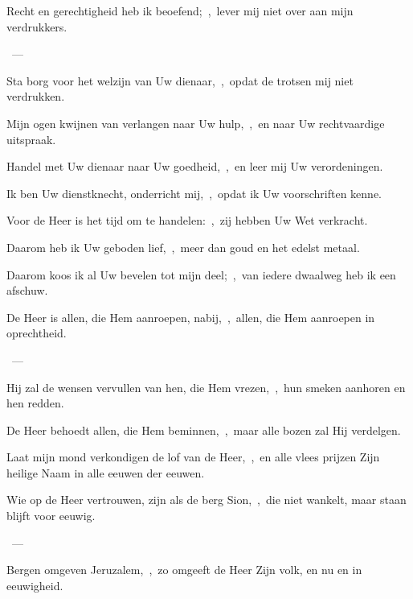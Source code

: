 \documentclass[12pt,twoside,a5paper]{article}
\begin{document}
\begin{halfparskip}
    Recht en gerechtigheid heb ik beoefend;~\sep\ lever mij niet over aan mijn verdrukkers.

  ~--- 

  Sta borg voor het welzijn van Uw dienaar,~\sep\ opdat de trotsen mij niet verdrukken.

  Mijn ogen kwijnen van verlangen naar Uw hulp,~\sep\ en naar Uw rechtvaardige uitspraak.

  Handel met Uw dienaar naar Uw goedheid,~\sep\ en leer mij Uw verordeningen.

  Ik ben Uw dienstknecht, onderricht mij,~\sep\ opdat ik Uw voorschriften kenne.

  Voor de Heer is het tijd om te handelen:~\sep\ zij hebben Uw Wet verkracht.

  Daarom heb ik Uw geboden lief,~\sep\ meer dan goud en het edelst metaal.

  Daarom koos ik al Uw bevelen tot mijn deel;~\sep\ van iedere dwaalweg heb ik een afschuw.
\end{halfparskip}

\begin{halfparskip}
    De Heer is allen, die Hem aanroepen, nabij,~\sep\ allen, die Hem aanroepen in oprechtheid.

  ~--- 

  Hij zal de wensen vervullen van hen, die Hem vrezen,~\sep\ hun smeken aanhoren en hen redden.

  De Heer behoedt allen, die Hem beminnen,~\sep\ maar alle bozen zal Hij verdelgen.

  Laat mijn mond verkondigen de lof van de Heer,~\sep\ en alle vlees prijzen Zijn heilige Naam in alle eeuwen der eeuwen.
\end{halfparskip}

\begin{halfparskip}
    Wie op de Heer vertrouwen, zijn als de berg Sion,~\sep\ die niet wankelt, maar staan blijft voor eeuwig.

  ~--- 

  Bergen omgeven Jeruzalem,~\sep\ zo omgeeft de Heer Zijn volk, en nu en in eeuwigheid.
\end{halfparskip}
\end{document}
